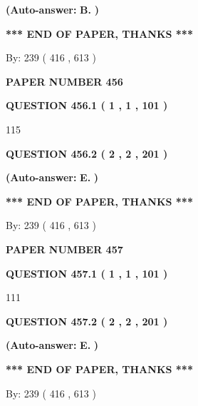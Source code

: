 \documentclass[12pt]{article}
\begin{document}
 
{\textbf{(Auto-answer:}}
{\textbf{\large{
B.}}}
{\textbf{)}}
 
 
   
   
   
   
\vspace{1.0in} 
{\textbf{\large{ *** END OF PAPER, THANKS *** }}} 
   
   
\hspace{1.0in} By: 
 239 ( 416 ,  613 )
   
   
   
   
\newpage 
\setcounter{page}{ 
   456001 } 
   
   
 {\textbf{ \Large{ PAPER NUMBER  456  }}}
   
   
   
   
  
  
{\textbf{\large{QUESTION
456.1 
 ( 1 , 1 , 101 )
}}}

115
  
  
{\textbf{\large{QUESTION
456.2 
 ( 2 , 2 , 201 )
}}}
 
 
{\textbf{(Auto-answer:}}
{\textbf{\large{
E.}}}
{\textbf{)}}
 
 
   
   
   
   
\vspace{1.0in} 
{\textbf{\large{ *** END OF PAPER, THANKS *** }}} 
   
   
\hspace{1.0in} By: 
 239 ( 416 ,  613 )
   
   
   
   
\newpage 
\setcounter{page}{ 
   457001 } 
   
   
 {\textbf{ \Large{ PAPER NUMBER  457  }}}
   
   
   
   
  
  
{\textbf{\large{QUESTION
457.1 
 ( 1 , 1 , 101 )
}}}

111
  
  
{\textbf{\large{QUESTION
457.2 
 ( 2 , 2 , 201 )
}}}
 
 
{\textbf{(Auto-answer:}}
{\textbf{\large{
E.}}}
{\textbf{)}}
 
 
   
   
   
   
\vspace{1.0in} 
{\textbf{\large{ *** END OF PAPER, THANKS *** }}} 
   
   
\hspace{1.0in} By: 
 239 ( 416 ,  613 )
   
   
   
\end{document}
